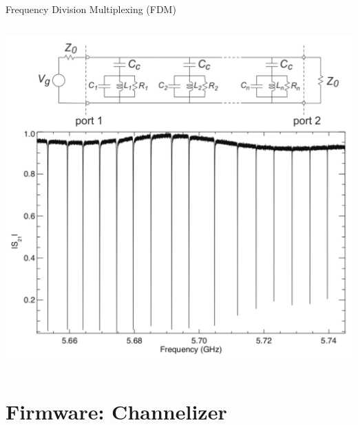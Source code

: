 \documentclass[ignorenonframetext,12pt]{beamer}
\begin{document}
\begin{frame}{Frequency Division Multiplexing (FDM)}
\begin{columns}
\begin{column}{0.5\textwidth}
\begin{center}
												\includegraphics[width=\textwidth]{fdm2}
								\end{center}
												\end{column}
								\end{columns}

\end{frame}

\section{Firmware: Channelizer}
\end{document}
